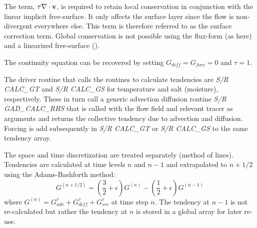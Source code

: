 The term, $\tau \nabla \cdot {\bf v}$, is required to retain local
conservation in conjunction with the linear implicit free-surface. It
only affects the surface layer since the flow is non-divergent
everywhere else. This term is therefore referred to as the surface
correction term. Global conservation is not possible using the
flux-form (as here) and a linearized free-surface
(\cite{griffies:00,campin:02}).

The continuity equation can be recovered by setting
$G_{diff}=G_{forc}=0$ and $\tau=1$.

The driver routine that calls the routines to calculate tendencies are
{\em S/R CALC\_GT} and {\em S/R CALC\_GS} for temperature and salt
(moisture), respectively. These in turn call a generic advection
diffusion routine {\em S/R GAD\_CALC\_RHS} that is called with the
flow field and relevant tracer as arguments and returns the collective
tendency due to advection and diffusion. Forcing is add subsequently
in {\em S/R CALC\_GT} or {\em S/R CALC\_GS} to the same tendency
array.


The space and time discretization are treated separately (method of
lines). Tendencies are calculated at time levels $n$ and $n-1$ and
extrapolated to $n+1/2$ using the Adams-Bashforth method:
\begin{equation}
G^{(n+1/2)} = 
(\frac{3}{2} + \epsilon) G^{(n)} - (\frac{1}{2} + \epsilon) G^{(n-1)}
\end{equation}
where $G^{(n)} = G_{adv}^\tau + G_{diff}^\tau + G_{src}^\tau$ at time
step $n$. The tendency at $n-1$ is not re-calculated but rather the
tendency at $n$ is stored in a global array for later re-use.


